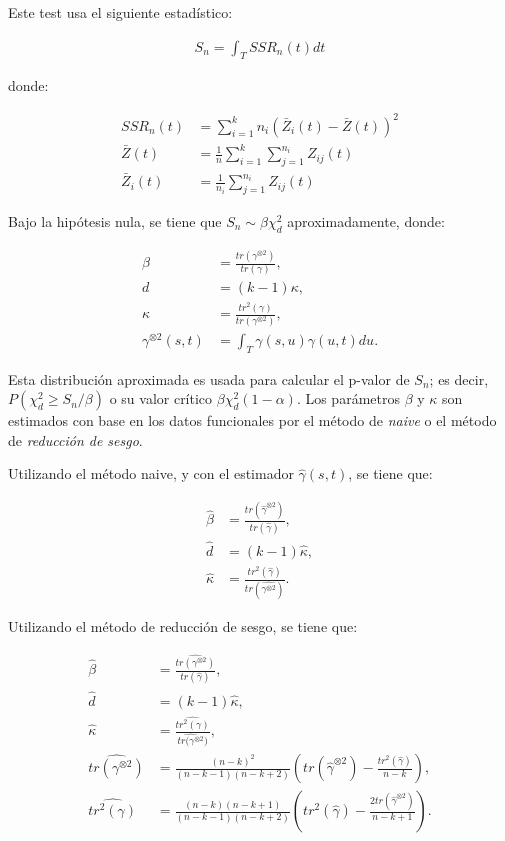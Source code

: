 \documentclass[
]{book}
\begin{document}
Este test usa el siguiente estadístico:

\begin{align}
    S_n=\int_T SSR_n(t)dt 
\end{align}

donde:

\begin{align}
     SSR_n(t)&=\sum_{i=1}^k n_i(\bar{Z}_i(t)-\bar{Z}(t))^2\\
     \bar{Z}(t)&=\frac{1}{n}\sum_{i=1}^k \sum_{j=1}^{n_i}Z_{ij}(t)\\
     \bar{Z}_i(t)&=\frac{1}{n_i}\sum_{j=1}^{n_i}Z_{ij}(t)
 \end{align}

Bajo la hipótesis nula, se tiene que \(S_n\sim \beta \chi_d^2\) aproximadamente, donde:

\begin{align}
    \beta &=\frac{tr(\gamma^{\otimes 2})}{tr(\gamma)},\\
    d&=(k-1)\kappa,\\
    \kappa&=\frac{tr^2(\gamma)}{tr(\gamma^{\otimes 2})},\\
    \gamma^{\otimes 2}(s,t)&=\int_T \gamma(s,u)\gamma(u,t)du.
\end{align}

Esta distribución aproximada es usada para calcular el p-valor de \(S_n\); es decir, \(P(\chi_d^2\geq S_n/\beta)\) o su valor crítico \(\beta\chi_d^2(1-\alpha)\). Los parámetros \(\beta\) y \(\kappa\) son estimados con base en los datos funcionales por el método de \textit{naive} o el método de \textit{reducción de sesgo}.

Utilizando el método naive, y con el estimador \({\hat{\gamma}}(s,t)\), se tiene que:

\begin{align}
    {\hat{\beta}}&=\frac{tr({\hat{\gamma}}^{\otimes 2})}{tr({\hat{\gamma}})},\\
    {\hat{d}}&=(k-1){\hat{\kappa}},\\
    {\hat{\kappa}}&=\frac{tr^2({\hat{\gamma}})}{tr({\hat{\gamma^{\otimes 2}}})}.
\end{align}

Utilizando el método de reducción de sesgo, se tiene que:

\begin{align}
    {\hat{\beta}}&=\frac{{\widehat{tr(\gamma^{\otimes 2})}}}{tr({\hat{\gamma}})},\\
    {\hat{d}}&=(k-1){\hat{\kappa}},\\
    {\hat{\kappa}}&=\frac{{\widehat{tr^2(\gamma)}}}{{\widehat{tr(\gamma^{\otimes 2}})}},\\
    {\widehat{tr(\gamma^{\otimes 2})}}&=\frac{(n-k)^2}{(n-k-1)(n-k+2)}\left(tr({\hat{\gamma}^{\otimes 2}})-\frac{tr^2({\hat{\gamma}})}{n-k} \right),\\
    {\widehat{tr^2(\gamma)}}&=\frac{(n-k)(n-k+1)}{(n-k-1)(n-k+2)}\left(tr^2({\hat{\gamma}})-\frac{2tr({\hat{\gamma}}^{\otimes 2})}{n-k+1}\right).
\end{align}
\end{document}
